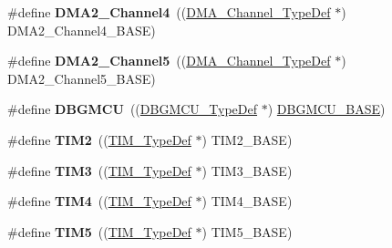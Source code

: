 \begin{DoxyCompactItemize}
\item 
\hypertarget{group___peripheral__declaration_ga612b396657695191ad740b0b59bc9f12}{\#define {\bfseries D\-M\-A2\-\_\-\-Channel4}~((\hyperlink{struct_d_m_a___channel___type_def}{D\-M\-A\-\_\-\-Channel\-\_\-\-Type\-Def} $\ast$) D\-M\-A2\-\_\-\-Channel4\-\_\-\-B\-A\-S\-E)}\label{group___peripheral__declaration_ga612b396657695191ad740b0b59bc9f12}

\item 
\hypertarget{group___peripheral__declaration_ga521c13b7d0f82a6897d47995da392750}{\#define {\bfseries D\-M\-A2\-\_\-\-Channel5}~((\hyperlink{struct_d_m_a___channel___type_def}{D\-M\-A\-\_\-\-Channel\-\_\-\-Type\-Def} $\ast$) D\-M\-A2\-\_\-\-Channel5\-\_\-\-B\-A\-S\-E)}\label{group___peripheral__declaration_ga521c13b7d0f82a6897d47995da392750}

\item 
\hypertarget{group___peripheral__declaration_ga92ec6d9ec2251fda7d4ce09748cd74b4}{\#define {\bfseries D\-B\-G\-M\-C\-U}~((\hyperlink{struct_d_b_g_m_c_u___type_def}{D\-B\-G\-M\-C\-U\-\_\-\-Type\-Def} $\ast$) \hyperlink{group___peripheral__memory__map_ga4adaf4fd82ccc3a538f1f27a70cdbbef}{D\-B\-G\-M\-C\-U\-\_\-\-B\-A\-S\-E})}\label{group___peripheral__declaration_ga92ec6d9ec2251fda7d4ce09748cd74b4}

\item 
\hypertarget{group___peripheral__declaration_ga3cfac9f2e43673f790f8668d48b4b92b}{\#define {\bfseries T\-I\-M2}~((\hyperlink{struct_t_i_m___type_def}{T\-I\-M\-\_\-\-Type\-Def} $\ast$) T\-I\-M2\-\_\-\-B\-A\-S\-E)}\label{group___peripheral__declaration_ga3cfac9f2e43673f790f8668d48b4b92b}

\item 
\hypertarget{group___peripheral__declaration_ga61ee4c391385607d7af432b63905fcc9}{\#define {\bfseries T\-I\-M3}~((\hyperlink{struct_t_i_m___type_def}{T\-I\-M\-\_\-\-Type\-Def} $\ast$) T\-I\-M3\-\_\-\-B\-A\-S\-E)}\label{group___peripheral__declaration_ga61ee4c391385607d7af432b63905fcc9}

\item 
\hypertarget{group___peripheral__declaration_ga91a09bad8bdc7a1cb3d85cf49c94c8ec}{\#define {\bfseries T\-I\-M4}~((\hyperlink{struct_t_i_m___type_def}{T\-I\-M\-\_\-\-Type\-Def} $\ast$) T\-I\-M4\-\_\-\-B\-A\-S\-E)}\label{group___peripheral__declaration_ga91a09bad8bdc7a1cb3d85cf49c94c8ec}

\item 
\hypertarget{group___peripheral__declaration_ga5125ff6a23a2ed66e2e19bd196128c14}{\#define {\bfseries T\-I\-M5}~((\hyperlink{struct_t_i_m___type_def}{T\-I\-M\-\_\-\-Type\-Def} $\ast$) T\-I\-M5\-\_\-\-B\-A\-S\-E)}\label{group___peripheral__declaration_ga5125ff6a23a2ed66e2e19bd196128c14}


\end{DoxyCompactItemize}
